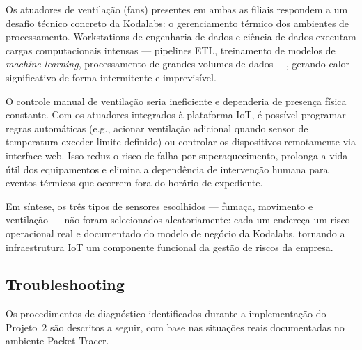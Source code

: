 \documentclass[12pt,a4paper]{article}
\begin{document}
Os atuadores de ventilação (fans) presentes em ambas as filiais respondem a um
desafio técnico concreto da Kodalabs: o gerenciamento térmico dos ambientes de
processamento. Workstations de engenharia de dados e ciência de dados executam
cargas computacionais intensas — pipelines ETL, treinamento de modelos de
\textit{machine learning}, processamento de grandes volumes de dados —, gerando
calor significativo de forma intermitente e imprevisível.

O controle manual de ventilação seria ineficiente e dependeria de presença física
constante. Com os atuadores integrados à plataforma IoT, é possível programar
regras automáticas (e.g., acionar ventilação adicional quando sensor de temperatura
exceder limite definido) ou controlar os dispositivos remotamente via interface web.
Isso reduz o risco de falha por superaquecimento, prolonga a vida útil dos
equipamentos e elimina a dependência de intervenção humana para eventos térmicos
que ocorrem fora do horário de expediente.

Em síntese, os três tipos de sensores escolhidos — fumaça, movimento e ventilação —
não foram selecionados aleatoriamente: cada um endereça um risco operacional real
e documentado do modelo de negócio da Kodalabs, tornando a infraestrutura IoT um
componente funcional da gestão de riscos da empresa.

\subsection{Troubleshooting}

Os procedimentos de diagnóstico identificados durante a implementação do Projeto~2
são descritos a seguir, com base nas situações reais documentadas no ambiente
Packet Tracer.
\end{document}
